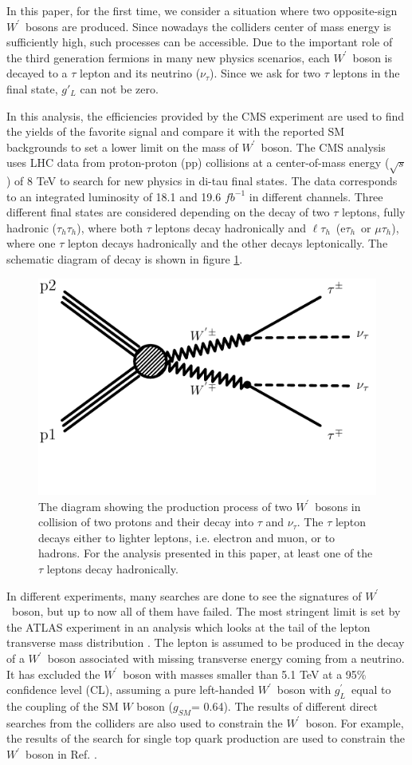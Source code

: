 \documentclass[preprint,showpacs,preprintnumbers]{revtex4}
\newcommand{\wprime}{\ensuremath{W^\prime}~}
\newcommand{\Tau}{\ensuremath{\tau_h}}
\newcommand{\tauTau}{\ensuremath{\tau_h\tau_h}}
\newcommand{\lepTau}{\ensuremath{\ell\tau_h}}
\newcommand{\gL}{\ensuremath{g^\prime_L}}
\newcommand{\gSM}{\ensuremath{g_{\scriptscriptstyle SM}}}
\begin{document}
In this paper, for the first time, we consider a situation where two opposite-sign \wprime bosons are produced. Since nowadays the colliders center of mass energy is sufficiently high, such processes can be accessible. Due to the important role of the third generation fermions in many new physics scenarios, each \wprime boson is decayed to a $\tau$ lepton and its neutrino ($\nu_{\tau}$). Since we ask for two $\tau$ leptons in the final state, $g'_L$ can not be zero. 

In this analysis, the efficiencies provided by the CMS experiment \cite{Khachatryan:2016trj} are used to find the yields of the favorite signal and compare it with the reported SM backgrounds to set a lower limit on the mass of \wprime boson. 
The CMS analysis uses LHC data from proton-proton (pp) collisions at a center-of-mass energy ($\sqrt{s}$) of 8 TeV to search for new physics in di-tau final states.  The data corresponds to an integrated luminosity of 18.1 and 19.6 $fb^{-1}$ in different channels. Three different final states are considered depending on the decay of two $\tau$ leptons, fully hadronic (\tauTau), where both $\tau$ leptons decay hadronically and \lepTau  ~(e\Tau ~or $\mu\Tau$), where one $\tau$ lepton decays hadronically and the other decays leptonically. The schematic diagram of decay is shown in figure \ref{fig:wprimefeyndiagram}.
\begin{figure}[!htb]
	\includegraphics*[width=.45\textwidth]{WpWpTauTau.pdf}
	\caption{The diagram showing the production process of two \wprime bosons in collision of two protons and their decay into $\tau$ and $\nu_{\tau}$. The $\tau$ lepton decays either to lighter leptons, i.e. electron and muon, or to hadrons. For the analysis presented in this paper, at least one of the $\tau$ leptons decay hadronically.}
	\label{fig:wprimefeyndiagram}
\end{figure}

In different experiments, many searches are done to see the signatures of \wprime boson, but up to now all of them have failed. The most stringent limit is set by the ATLAS experiment in an analysis which looks at the tail of the lepton transverse mass distribution \cite{Aaboud:2017efa}. The lepton is assumed to be produced in the decay of a \wprime boson associated with missing transverse energy coming from a neutrino. It has excluded the \wprime boson with masses smaller than 5.1 TeV at a 95\% confidence level (CL), assuming a pure left-handed \wprime boson with \gL ~equal to the coupling of the SM $W$ boson (\gSM = 0.64).  The results of different direct searches from the colliders are also used to constrain the \wprime boson. For example, the results of the search for single top quark production are used to constrain the \wprime boson in Ref. \cite{YaserAyazi:2017xyj}.
\end{document}
